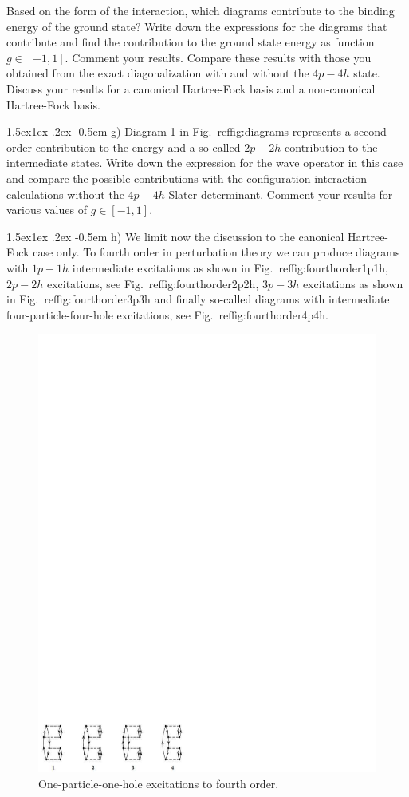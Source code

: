 \documentclass[%
twoside,                 %
final,                   %
10pt]{article}
\makeatletter
\newenvironment{doconceexercise}{}{}
\newcommand\subex{\@startsection{paragraph}{4}{\z@}%
                  {1.5ex\@plus1ex \@minus.2ex}%
                  {-0.5em}%
                  {\normalfont\normalsize\bfseries}}
\makeatother
\begin{document}
\begin{doconceexercise}
Based on the form of the interaction, which diagrams contribute to the
binding energy of the ground state?  Write down the expressions for
the diagrams that contribute and find the contribution to the ground
state energy as function $g\in [-1,1]$. Comment your results.  Compare
these results with those you obtained from the exact diagonalization with and without the $4p-4h$ state.
Discuss your results for a canonical Hartree-Fock basis and a non-canonical Hartree-Fock basis.

\subex{g)}
Diagram 1 in Fig.~ref{fig:diagrams} represents a second-order contribution to the energy and a so-called $2p-2h$ contribution to the intermediate states. Write down the expression for the wave operator in this case and compare the possible contributions with the configuration interaction calculations without the $4p-4h$ Slater determinant. Comment your results for 
various values of $g\in [-1,1]$.

\subex{h)}
We limit now the discussion to the canonical Hartree-Fock case only. To fourth order in perturbation theory we can produce diagrams with $1p-1h$ intermediate excitations as shown in Fig.~ref{fig:fourthorder1p1h}, $2p-2h$ excitations, see Fig.~ref{fig:fourthorder2p2h}, $3p-3h$ excitations as shown in Fig.~ref{fig:fourthorder3p3h} and finally so-called diagrams with intermediate four-particle-four-hole excitations, see Fig.~ref{fig:fourthorder4p4h}. 

\begin{figure}[t]
  \centerline{\includegraphics[width=0.6\linewidth]{fig-proj/1p1h.pdf}}
  \caption{
  One-particle-one-hole excitations to fourth order. \label{fig:fourthorder1p1h}
  }
\end{figure}




\end{doconceexercise}
\end{document}

